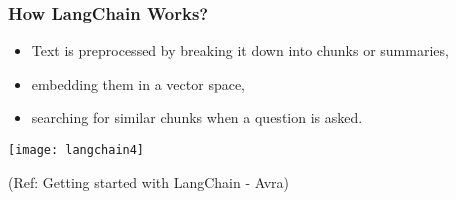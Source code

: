 \begin{frame}\frametitle{How LangChain Works?}

\begin{itemize}
\item Text is preprocessed by breaking it down into chunks or summaries, 
\item embedding them in a vector space, 
\item searching for similar chunks when a question is asked. 
\end{itemize}

\begin{center}
\texttt{[image: langchain4]}
\end{center}	  


{\tiny (Ref: Getting started with LangChain - Avra)}
\end{frame}









